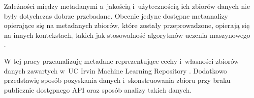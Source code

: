 Zależności między metadanymi a~jakością i~użytecznością ich zbiorów danych nie były dotychczas dobrze przebadane.
Obecnie jedyne dostępne metaanalizy opierające się na metadanych zbiorów, które zostały przeprowadzone, opierają się na innych kontekstach, takich jak stosowalność algorytmów uczenia maszynowego \cite{brazdil1994characterizing}.

W tej pracy przeanalizuję metadane reprezentujące cechy i~własności zbiorów danych zawartych w~UC Irvin Machine Learning Repository \cite{Dua:2021}.
Dodatkowo przedstawię sposób pozyskania danych i~skonstruowania zbioru przy braku publicznie dostępnego API oraz sposób analizy takich danych.
